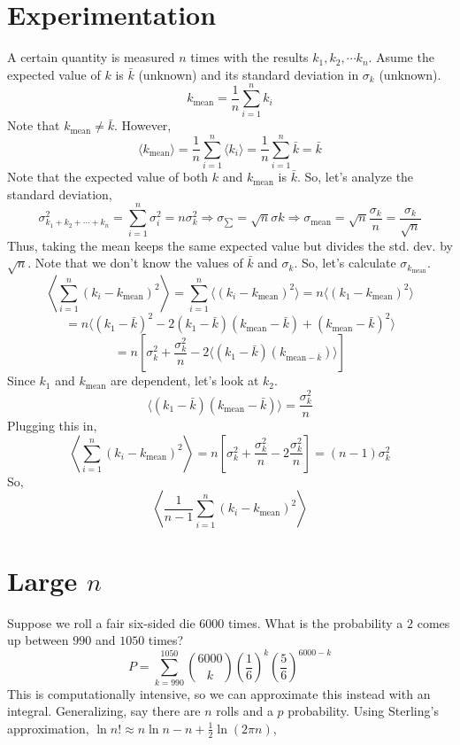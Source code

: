 \documentclass[../main.tex]{subfiles}
\newcommand{\expect}[1]{{\langle #1 \rangle}}
\newcommand{\expectl}[1]{{\left\langle #1 \right\rangle}}
\begin{document}
\section{Experimentation}
A certain quantity is measured $n$ times with the results $k_1 , k_2 , \cdots k_n$.
Asume the expected value of $k$ is $\bar{k}$ (unknown) and its standard deviation in $\sigma_{k}$ (unknown).
$$k_{\text{mean}}=\frac{1}{n}\sum_{i=1}^{n}k_{i}$$
Note that $k_{\text{mean}}\neq \bar{k}$. However,
$$\expect{k_{\text{mean}}}=\frac{1}{n}\sum_{i=1}^{n}\expect{k_{i}}=\frac{1}{n}\sum_{i=1}^{n}\bar{k}=\bar{k}$$
Note that the expected value of both $k$ and $k_{\text{mean}}$ is $\bar{k}$. So, let's analyze the standard deviation,
$$\sigma_{k_1 + k_2 + \cdots + k_n}^{2}=\sum_{i=1}^{n}\sigma_{i}^{2}=n\sigma_{k}^{2}
\Rightarrow \sigma_{\sum}=\sqrt{n}\sigma{k}
\Rightarrow \sigma_{\text{mean}}=\sqrt{n}\frac{\sigma_{k}}{n}=\frac{\sigma_{k}}{\sqrt{n}}
$$
Thus, taking the mean keeps the same expected value but divides the std. dev. by $\sqrt{n}$.
Note that we don't know the values of $\bar{k}$ and $\sigma_{k}$. So, let's calculate $\sigma_{k_{\text{mean}}}$.
$$\expectl{\sum_{i=1}^{n}(k_{i}-k_{\text{mean}})^{2}}=\sum_{i=1}^{n}\expect{(k_{i}-k_{\text{mean}})^{2}}=n\expect{(k_{1}-k_{\text{mean}})^{2}}$$
$$=n\expect{
    (k_{1}-\bar{k})^{2}
    -2(k_{1}-\bar{k})(k_{\text{mean}}-\bar{k})
    +(k_{\text{mean}}-\bar{k})^{2}
    }$$
$$=n\left[\sigma_{k}^{2}+\frac{\sigma_{k}^{2}}{n}-2\expect{(k_{1}-\bar{k})(k_{\text{mean}-\bar{k}})}\right]$$
Since $k_{1}$ and $k_{\text{mean}}$ are dependent, let's look at $k_{2}$.
$$\expect{(k_{1}-\bar{k})(k_{\text{mean}}-\bar{k})}=\frac{\sigma_{k}^{2}}{n}$$
Plugging this in,
$$\expectl{\sum_{i=1}^{n}(k_{i}-k_{\text{mean}})^{2}}=
n\left[\sigma_{k}^{2}+\frac{\sigma_{k}^{2}}{n}-2\frac{\sigma_{k}^{2}}{n}\right]=(n-1)\sigma_{k}^{2}$$
So,
$$\expectl{\frac{1}{n-1}\sum_{i=1}^{n}(k_{i}-k_{\text{mean}})^{2}}$$

\section{Large $n$}
Suppose we roll a fair six-sided die 6000 times. What is the probability a $2$ comes up between $990$ and $1050$ times?
$$P=\sum_{k=990}^{1050}{6000 \choose k}\left(\frac{1}{6}\right)^{k}\left(\frac{5}{6}\right)^{6000-k}$$
This is computationally intensive, so we can approximate this instead with an integral. Generalizing, say there are $n$ rolls and a $p$
probability. Using Sterling's approximation, $\ln n! \approx n\ln n- n + \frac{1}{2}\ln(2\pi n)$,
\end{document}
